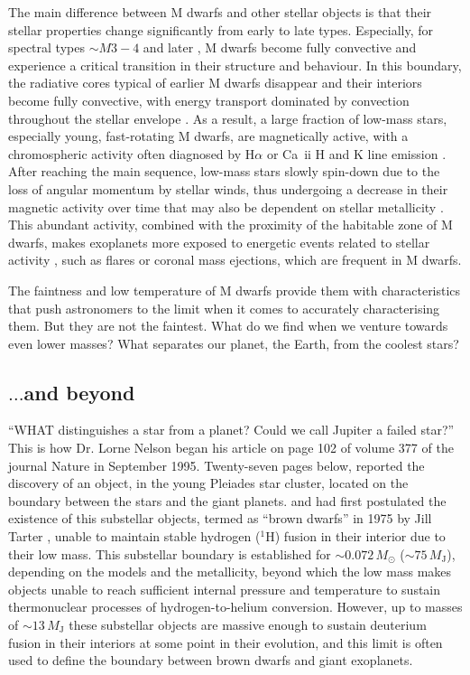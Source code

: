 The main difference between M dwarfs and other stellar objects is that their stellar properties change significantly from early to late types. Especially, for spectral types $\sim M3-4$ and later \citep[masses below $0.35$\,$M_{\odot}$; ][]{chabrier1997}, M dwarfs become fully convective and experience a critical transition in their structure and behaviour. In this boundary, the radiative cores typical of earlier M dwarfs disappear and their interiors become fully convective, with energy transport dominated by convection throughout the stellar envelope \citep{delfosse1998,reiners2009}. As a result, a large fraction of low-mass stars, especially young, fast-rotating M dwarfs, are magnetically active, with a chromospheric activity often diagnosed by H$\alpha$ or Ca~{\sc ii} H and K line emission \citep{cincunegui2007,ibanezbustos2023}. After reaching the main sequence, low-mass stars slowly spin-down due to the loss of angular momentum by stellar winds, thus undergoing a decrease in their magnetic activity over time \citep{yang2017,davenport2019,raetz2020} that may also be dependent on stellar metallicity \citep{see24}. This abundant activity, combined with the proximity of the habitable zone of M dwarfs, makes exoplanets more exposed to energetic events related to stellar activity \citep{tilley2019,gunther2020,chen2021}, such as flares or coronal mass ejections, which are frequent in M dwarfs.

The faintness and low temperature of M dwarfs provide them with characteristics that push astronomers to the limit when it comes to accurately characterising them. But they are not the faintest. What do we find when we venture towards even lower masses? What separates our planet, the Earth, from the coolest stars?


\subsection{$\dots$and beyond} \label{sec:ucds_intro}

``WHAT distinguishes a star from a planet? Could we call Jupiter a failed star?'' This is how Dr. Lorne Nelson began his article on page 102 of volume 377 of the journal Nature in September 1995. Twenty-seven pages below, \citet{rebolo1995} reported the discovery of an object, in the young Pleiades star cluster, located on the boundary between the stars and the giant planets. \citet{kumar1963b,kumar1963} and \citet{hayashi1963} had first postulated the existence of this substellar objects, termed as ``brown dwarfs'' in 1975 by Jill Tarter \citep{tarter2014}, unable to maintain stable hydrogen ($^1$H) fusion in their interior due to their low mass. This substellar boundary is established for $\sim0.072$\,$M_{\odot}$ ($\sim75$\,$M_{\mathrm{J}}$), depending on the models and the metallicity, beyond which the low mass makes objects unable to reach sufficient internal pressure and temperature to sustain thermonuclear processes of hydrogen-to-helium conversion. However, up to masses of $\sim13$\,$M_{\mathrm{J}}$ \citep{chabrier2000} these substellar objects are massive enough to sustain deuterium fusion in their interiors at some point in their evolution, and this limit is often used to define the boundary between brown dwarfs and giant exoplanets.

